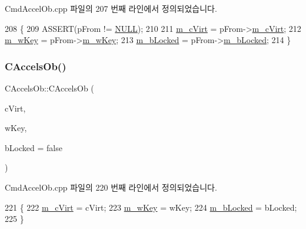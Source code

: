 Cmd\+Accel\+Ob.\+cpp 파일의 207 번째 라인에서 정의되었습니다.


\begin{DoxyCode}
208 \{
209   ASSERT(pFrom != \mbox{\hyperlink{getopt1_8c_a070d2ce7b6bb7e5c05602aa8c308d0c4}{NULL}});
210   
211   \mbox{\hyperlink{class_c_accels_ob_a08b7003ccf92c6afcf31878960d8eee1}{m\_cVirt}} = pFrom->\mbox{\hyperlink{class_c_accels_ob_a08b7003ccf92c6afcf31878960d8eee1}{m\_cVirt}};
212   \mbox{\hyperlink{class_c_accels_ob_a1891250e9a4d00c0862f3a90a965d635}{m\_wKey}} = pFrom->\mbox{\hyperlink{class_c_accels_ob_a1891250e9a4d00c0862f3a90a965d635}{m\_wKey}};
213   \mbox{\hyperlink{class_c_accels_ob_ad8300bd20bd429ad61f89700e388dd9a}{m\_bLocked}} = pFrom->\mbox{\hyperlink{class_c_accels_ob_ad8300bd20bd429ad61f89700e388dd9a}{m\_bLocked}};
214 \}
\end{DoxyCode}
\mbox{\label{class_c_accels_ob_acba35eec2e75114289468292870bf484}} 
\subsubsection{\texorpdfstring{C\+Accels\+Ob()}{CAccelsOb()}\hspace{0.1cm}{\footnotesize\ttfamily [3/4]}}
{\footnotesize\ttfamily C\+Accels\+Ob\+::\+C\+Accels\+Ob (\begin{DoxyParamCaption}\item[{B\+Y\+TE}]{c\+Virt,  }\item[{W\+O\+RD}]{w\+Key,  }\item[{bool}]{b\+Locked = {\ttfamily false} }\end{DoxyParamCaption})}



Cmd\+Accel\+Ob.\+cpp 파일의 220 번째 라인에서 정의되었습니다.


\begin{DoxyCode}
221 \{
222   \mbox{\hyperlink{class_c_accels_ob_a08b7003ccf92c6afcf31878960d8eee1}{m\_cVirt}} = cVirt;
223   \mbox{\hyperlink{class_c_accels_ob_a1891250e9a4d00c0862f3a90a965d635}{m\_wKey}} = wKey;
224   \mbox{\hyperlink{class_c_accels_ob_ad8300bd20bd429ad61f89700e388dd9a}{m\_bLocked}} = bLocked;
225 \}
\end{DoxyCode}
\mbox{\label{class_c_accels_ob_aa28d7238be643bb20d922cb360881bd6}} 
